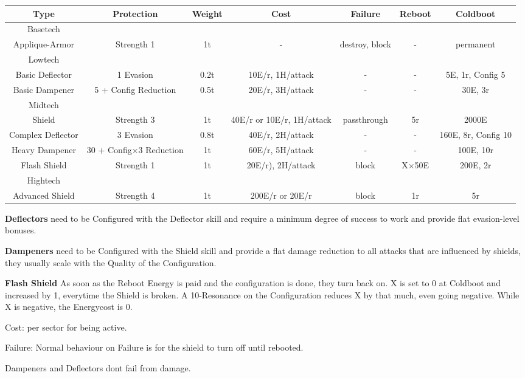 \begin{tabular}{c|cccccc}
    Type & Protection &Weight& Cost & Failure  & Reboot & Coldboot \\
    \hline Basetech\\
    Applique-Armor & Strength 1 & 1t & - & destroy, block & - & permanent \\
    \hline Lowtech\\
    Basic Deflector & 1 Evasion & 0.2t & 10E/r, 1H/attack & - & - & 5E, 1r, Config 5\\
    Basic Dampener & 5 + Config Reduction & 0.5t & 20E/r, 3H/attack & - & - & 30E, 3r \\
    \hline Midtech\\
    Shield & Strength 3 & 1t & 40E/r or 10E/r, 1H/attack & passthrough & 5r & 2000E \\
    Complex Deflector & 3 Evasion & 0.8t & 40E/r, 2H/attack & - & - & 160E, 8r, Config 10\\
    Heavy Dampener & 30 + Config\(\times 3\) Reduction & 1t & 60E/r, 5H/attack & - & - & 100E, 10r\\
    Flash Shield & Strength 1 & 1t & 20E/r), 2H/attack & block & X\(\times\)50E & 200E, 2r\\
    \hline Hightech\\
    Advanced Shield & Strength 4 & 1t & 200E/r or 20E/r & block & 1r & 5r
\end{tabular}

\vspace{1cm}

\textbf{Deflectors} need to be Configured with the Deflector skill and require a minimum degree of success to
work and provide flat evasion-level bonuses.

\textbf{Dampeners} need to be Configured with the Shield skill and provide a flat damage reduction to all
attacks that are influenced by shields, they usually scale with the Quality of the Configuration.

\textbf{Flash Shield} As soon as the Reboot Energy is paid and the configuration is done, they turn back on.
X is set to 0 at Coldboot and increased by 1, everytime the Shield is broken.
A 10-Resonance on the Configuration reduces X by that much, even going negative.
While X is negative, the Energycost is 0.

Cost: per sector for being active.

Failure: Normal behaviour on Failure is for the shield to turn off until rebooted.

Dampeners and Deflectors dont fail from damage.

